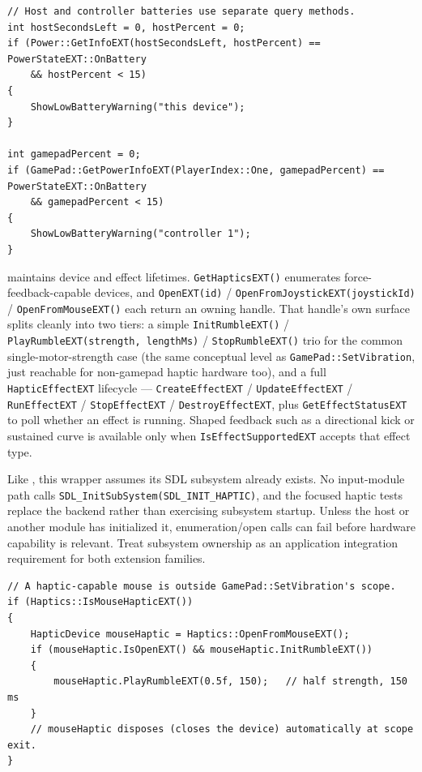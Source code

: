 \begin{lstlisting}
// Host and controller batteries use separate query methods.
int hostSecondsLeft = 0, hostPercent = 0;
if (Power::GetInfoEXT(hostSecondsLeft, hostPercent) == PowerStateEXT::OnBattery
    && hostPercent < 15)
{
    ShowLowBatteryWarning("this device");
}

int gamepadPercent = 0;
if (GamePad::GetPowerInfoEXT(PlayerIndex::One, gamepadPercent) == PowerStateEXT::OnBattery
    && gamepadPercent < 15)
{
    ShowLowBatteryWarning("controller 1");
}
\end{lstlisting}

 maintains device and effect lifetimes. \texttt{GetHapticsEXT()} enumerates
force-feedback-capable
devices, and \texttt{OpenEXT(id)} / \texttt{OpenFromJoystickEXT(joystickId)} /
\texttt{OpenFromMouseEXT()} each return an owning  handle. That handle's
own surface splits cleanly into two tiers: a simple \texttt{InitRumbleEXT()} /
\texttt{PlayRumbleEXT(strength, lengthMs)} / \texttt{StopRumbleEXT()} trio for the common
single-motor-strength case (the same conceptual level as \texttt{GamePad::SetVibration}, just
reachable for non-gamepad haptic hardware too), and a full \texttt{HapticEffectEXT}
lifecycle --- \texttt{CreateEffectEXT} / \texttt{UpdateEffectEXT} / \texttt{RunEffectEXT} /
\texttt{StopEffectEXT} / \texttt{DestroyEffectEXT}, plus \texttt{GetEffectStatusEXT} to poll
whether an effect is running. Shaped feedback such as a directional kick or sustained curve is
available only when \texttt{IsEffectSupportedEXT} accepts that effect type.

Like , this wrapper assumes its SDL subsystem already exists. No input-module
path calls \texttt{SDL\_InitSubSystem(SDL\_INIT\_HAPTIC)}, and the focused haptic tests replace
the backend rather than exercising subsystem startup. Unless the host or another module has
initialized it, enumeration/open calls can fail before hardware capability is relevant. Treat
subsystem ownership as an application integration requirement for both extension families.

\begin{lstlisting}
// A haptic-capable mouse is outside GamePad::SetVibration's scope.
if (Haptics::IsMouseHapticEXT())
{
    HapticDevice mouseHaptic = Haptics::OpenFromMouseEXT();
    if (mouseHaptic.IsOpenEXT() && mouseHaptic.InitRumbleEXT())
    {
        mouseHaptic.PlayRumbleEXT(0.5f, 150);   // half strength, 150 ms
    }
    // mouseHaptic disposes (closes the device) automatically at scope exit.
}
\end{lstlisting}

